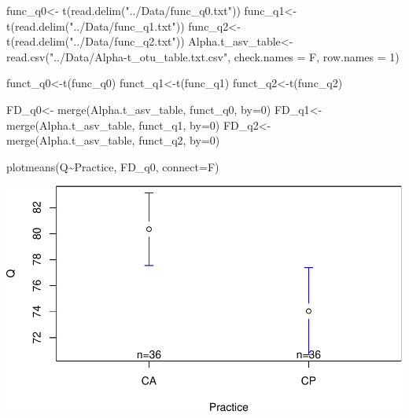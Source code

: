 \documentclass[]{interact}
\theoremstyle{plain}%
\theoremstyle{definition}
\theoremstyle{remark}
\newenvironment{Shaded}{\begin{snugshade}}{\end{snugshade}}
\newcommand{\AttributeTok}[1]{\textcolor[rgb]{0.77,0.63,0.00}{#1}}
\newcommand{\DecValTok}[1]{\textcolor[rgb]{0.00,0.00,0.81}{#1}}
\newcommand{\FunctionTok}[1]{\textcolor[rgb]{0.00,0.00,0.00}{#1}}
\newcommand{\NormalTok}[1]{#1}
\newcommand{\OtherTok}[1]{\textcolor[rgb]{0.56,0.35,0.01}{#1}}
\newcommand{\SpecialCharTok}[1]{\textcolor[rgb]{0.00,0.00,0.00}{#1}}
\newcommand{\StringTok}[1]{\textcolor[rgb]{0.31,0.60,0.02}{#1}}
\begin{document}
\begin{Shaded}
\begin{Highlighting}[]
\NormalTok{func\_q0}\OtherTok{\textless{}{-}} \FunctionTok{t}\NormalTok{(}\FunctionTok{read.delim}\NormalTok{(}\StringTok{"../Data/func\_q0.txt"}\NormalTok{))}
\NormalTok{func\_q1}\OtherTok{\textless{}{-}} \FunctionTok{t}\NormalTok{(}\FunctionTok{read.delim}\NormalTok{(}\StringTok{"../Data/func\_q1.txt"}\NormalTok{))}
\NormalTok{func\_q2}\OtherTok{\textless{}{-}} \FunctionTok{t}\NormalTok{(}\FunctionTok{read.delim}\NormalTok{(}\StringTok{"../Data/func\_q2.txt"}\NormalTok{))}
\NormalTok{Alpha.t\_asv\_table}\OtherTok{\textless{}{-}} \FunctionTok{read.csv}\NormalTok{(}\StringTok{"../Data/Alpha{-}t\_otu\_table.txt.csv"}\NormalTok{, }\AttributeTok{check.names =}\NormalTok{ F, }\AttributeTok{row.names =} \DecValTok{1}\NormalTok{)}


\NormalTok{funct\_q0}\OtherTok{\textless{}{-}}\FunctionTok{t}\NormalTok{(func\_q0)}
\NormalTok{funct\_q1}\OtherTok{\textless{}{-}}\FunctionTok{t}\NormalTok{(func\_q1)}
\NormalTok{funct\_q2}\OtherTok{\textless{}{-}}\FunctionTok{t}\NormalTok{(func\_q2)}

\NormalTok{FD\_q0}\OtherTok{\textless{}{-}} \FunctionTok{merge}\NormalTok{(Alpha.t\_asv\_table, funct\_q0, }\AttributeTok{by=}\DecValTok{0}\NormalTok{)}
\NormalTok{FD\_q1}\OtherTok{\textless{}{-}} \FunctionTok{merge}\NormalTok{(Alpha.t\_asv\_table, funct\_q1, }\AttributeTok{by=}\DecValTok{0}\NormalTok{)}
\NormalTok{FD\_q2}\OtherTok{\textless{}{-}} \FunctionTok{merge}\NormalTok{(Alpha.t\_asv\_table, funct\_q2, }\AttributeTok{by=}\DecValTok{0}\NormalTok{)}


\FunctionTok{plotmeans}\NormalTok{(Q}\SpecialCharTok{\textasciitilde{}}\NormalTok{Practice, FD\_q0, }\AttributeTok{connect=}\NormalTok{F)}
\end{Highlighting}
\end{Shaded}

\includegraphics{Doc_pdf_files/figure-latex/unnamed-chunk-12-1.pdf}
\end{document}
